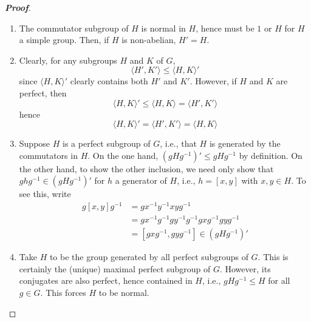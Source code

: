 \documentclass[12pt,leqno]{book}
\theoremstyle{definition}
\newenvironment{Proof}{\begin{proof}[\textnormal{\textbf{Proof}}]}{\end{proof}}
\begin{document}
\begin{enumerate}
\begin{Proof}\indent
 \begin{enumerate}
  \item The commutator subgroup of $H$ is normal in $H$, hence must be $1$ or $H$ for $H$ a simple group. Then, if $H$ is non-abelian, $H'=H$.
  \item Clearly, for any subgroups $H$ and $K$ of $G$, \[\langle H',K'\rangle\leq\langle H,K\rangle'\] since $\langle H,K\rangle'$ clearly contains both $H'$ and $K'$. However, if $H$ and $K$ are perfect, then \[\langle H,K\rangle'\leq\langle H,K\rangle=\langle H',K'\rangle\] hence \[\langle H,K\rangle'=\langle H',K'\rangle=\langle H,K\rangle\]
  \item Suppose $H$ is a perfect subgroup of $G$, i.e., that $H$ is generated by the commutators in $H$. On the one hand, $(gHg^{-1})'\leq gHg^{-1}$ by definition. On the other hand, to show the other inclusion, we need only show that $ghg^{-1}\in(gHg^{-1})'$ for $h$ a generator of $H$, i.e., $h=[x,y]$ with $x,y\in H$. To see this, write \begin{align*}g[x,y]g^{-1}&=gx^{-1}y^{-1}xyg^{-1}\\&=gx^{-1}g^{-1}gy^{-1}g^{-1}gxg^{-1}gyg^{-1}\\&=[gxg^{-1},gyg^{-1}]\in(gHg^{-1})'\end{align*}
  \item Take $H$ to be the group generated by all perfect subgroups of $G$. This is certainly the (unique) maximal perfect subgroup of $G$. However, its conjugates are also perfect, hence contained in $H$, i.e., $gHg^{-1}\leq H$ for all $g\in G$. This forces $H$ to be normal.
 \end{enumerate}

\end{Proof}

\end{enumerate}
\end{document}
